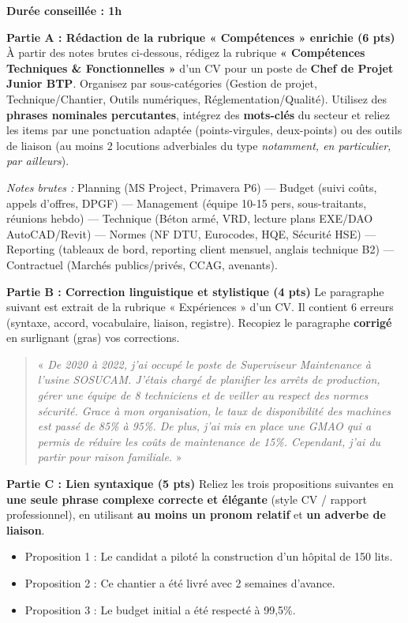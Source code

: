 \documentclass[11pt]{article}
\begin{document}
\begin{exercice}
\textbf{Durée conseillée : 1h}

\textbf{Partie A : Rédaction de la rubrique « Compétences » enrichie (6 pts)}
À partir des notes brutes ci-dessous, rédigez la rubrique \textbf{« Compétences Techniques \& Fonctionnelles »} d'un CV pour un poste de \textbf{Chef de Projet Junior BTP}. Organisez par sous-catégories (Gestion de projet, Technique/Chantier, Outils numériques, Réglementation/Qualité). Utilisez des \textbf{phrases nominales percutantes}, intégrez des \textbf{mots-clés} du secteur et reliez les items par une ponctuation adaptée (points-virgules, deux-points) ou des outils de liaison (au moins 2 locutions adverbiales du type \textit{notamment, en particulier, par ailleurs}).

\textit{Notes brutes :} Planning (MS Project, Primavera P6) — Budget (suivi coûts, appels d'offres, DPGF) — Management (équipe 10-15 pers, sous-traitants, réunions hebdo) — Technique (Béton armé, VRD, lecture plans EXE/DAO AutoCAD/Revit) — Normes (NF DTU, Eurocodes, HQE, Sécurité HSE) — Reporting (tableaux de bord, reporting client mensuel, anglais technique B2) — Contractuel (Marchés publics/privés, CCAG, avenants).

\textbf{Partie B : Correction linguistique et stylistique (4 pts)}
Le paragraphe suivant est extrait de la rubrique « Expériences » d'un CV. Il contient 6 erreurs (syntaxe, accord, vocabulaire, liaison, registre). Recopiez le paragraphe \textbf{corrigé} en surlignant (gras) vos corrections.

\begin{quote}
« \textit{De 2020 à 2022, j'ai occupé le poste de Superviseur Maintenance à l'usine SOSUCAM. J'étais chargé de planifier les arrêts de production, gérer une équipe de 8 techniciens et de veiller au respect des normes sécurité. Grace à mon organisation, le taux de disponibilité des machines est passé de 85\% à 95\%. De plus, j'ai mis en place une GMAO qui a permis de réduire les coûts de maintenance de 15\%. Cependant, j'ai du partir pour raison familiale.} »
\end{quote}

\textbf{Partie C : Lien syntaxique (5 pts)}
Reliez les trois propositions suivantes en \textbf{une seule phrase complexe correcte et élégante} (style CV / rapport professionnel), en utilisant \textbf{au moins un pronom relatif} et \textbf{un adverbe de liaison}.
\begin{itemize}
\item Proposition 1 : Le candidat a piloté la construction d'un hôpital de 150 lits.
\item Proposition 2 : Ce chantier a été livré avec 2 semaines d'avance.
\item Proposition 3 : Le budget initial a été respecté à 99,5\%.
\end{itemize}
\end{exercice}
\end{document}

